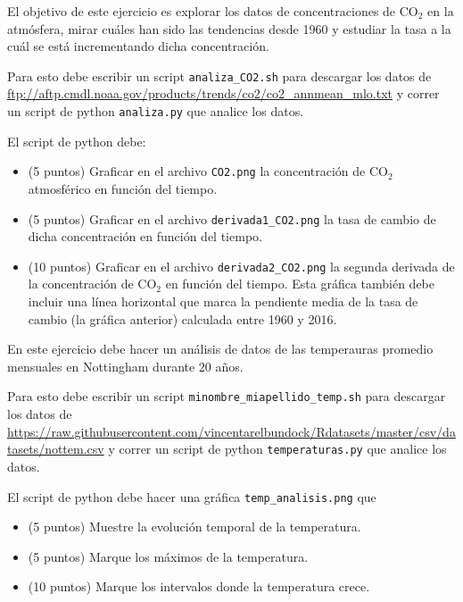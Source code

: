 \documentclass[11pt,letterpaper]{exam}
\begin{document}
\begin{questions}


El objetivo de este ejercicio es explorar los datos de concentraciones
de CO$_2$ en la atmósfera, mirar cuáles han sido las tendencias desde
1960 y estudiar la tasa a la cuál se está incrementando dicha
concentración. 

Para esto debe escribir un script \verb"analiza_CO2.sh" para descargar los datos de
\url{ftp://aftp.cmdl.noaa.gov/products/trends/co2/co2_annmean_mlo.txt}
y correr un script de python \verb"analiza.py" que analice los datos.

El script de python debe: 

\begin{itemize}
\item (5 puntos) Graficar en el archivo \verb"CO2.png" la concentración de CO$_2$
  atmosférico en función del tiempo.
\item (5 puntos) Graficar en el archivo \verb"derivada1_CO2.png" la tasa de
  cambio de dicha concentración en función del tiempo. 
\item (10 puntos) Graficar en el archivo \verb"derivada2_CO2.png" la segunda
  derivada de la concentraci\'on de CO$_2$ en funci\'on del tiempo.
  Esta gr\'afica tambi\'en debe incluir una l\'inea horizontal que
  marca la pendiente media de la tasa de cambio (la gr\'afica anterior)
  calculada entre 1960 y 2016.
\end{itemize}


En este ejercicio debe hacer un análisis de datos de las temperauras
promedio mensuales en Nottingham durante 20 años. 

Para esto debe escribir un script \verb"minombre_miapellido_temp.sh"
para descargar los datos de
\url{https://raw.githubusercontent.com/vincentarelbundock/Rdatasets/master/csv/datasets/nottem.csv}
y correr un script de python \verb"temperaturas.py" que analice los datos. 

El script de python debe hacer una gr\'afica \verb"temp_analisis.png"
que 

\begin{itemize}
\item (5 puntos) Muestre la evoluci\'on temporal de la temperatura. 
\item (5 puntos) Marque los m\'aximos de la temperatura.
\item (10 puntos) Marque los intervalos donde la temperatura crece. 
\end{itemize} 



\end{questions}
\end{document}
